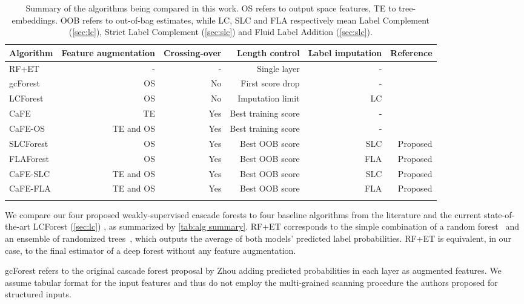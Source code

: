 \documentclass[conference,compsoc]{IEEEtran}
\begin{document}
\begin{table*}[tb]
    \centering
    \begin{tabular}{lrrrrr}
        \toprule
         Algorithm & Feature augmentation & Crossing-over & Length control & Label imputation & Reference \\
        \midrule
         RF+ET & - & - & Single layer & - & \cite{breiman2001random, geurts2006extremely} \\
         gcForest & OS & No & First score drop & - & \cite{zhou2019deep} \\
         LCForest & OS & No & Imputation limit & LC & \cite{wang2020learning} \\
         CaFE &  TE & Yes & Best training score & - & \cite{nakano2022deep} \\
         CaFE-OS &  TE and OS & Yes & Best training score & - & \cite{nakano2022deep} \\
        \midrule
         SLCForest &  OS & Yes & Best OOB score & SLC & Proposed\\
         FLAForest &  OS & Yes & Best OOB score & FLA & Proposed \\
         CaFE-SLC &  TE and OS & Yes & Best OOB score & SLC & Proposed \\
         CaFE-FLA &  TE and OS & Yes & Best OOB score & FLA & Proposed \\
        \bottomrule \\
    \end{tabular}
    \caption{Summary of the algorithms being compared in this work. OS refers to output space features, TE to tree-embeddings. OOB refers to out-of-bag estimates, while LC, SLC and FLA respectively mean Label Complement (\autoref{sec:lc}), Strict Label Complement (\autoref{sec:slc}) and Fluid Label Addition (\autoref{sec:slc}).}
    \label{tab:alg summary}
\end{table*}

We compare our four proposed weakly-supervised cascade forests to four baseline algorithms from the literature and the current state-of-the-art LCForest (\autoref{sec:lc}) \cite{wang2020learning}, as summarized by \autoref{tab:alg summary}. RF+ET corresponds to the simple combination of a random forest~\cite{breiman2001random} and an ensemble of randomized trees~\cite{geurts2006extremely}, which outputs the average of both models' predicted label probabilities. RF+ET is equivalent, in our case, to the final estimator of a deep forest without any feature augmentation. 

gcForest refers to the original cascade forest proposal by Zhou \cite{zhou2019deep} adding predicted probabilities in each layer as augmented features. We assume tabular format for the input features and thus do not employ the multi-grained scanning procedure the authors proposed for structured inputs.
\end{document}

